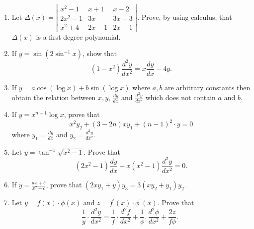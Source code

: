 \begin{enumerate}
\[\begin{array}{ccc}
    f^{\prime}(x) & \phi^{\prime}(x) & \psi^{\prime \prime}(x) \\
    f^{\prime \prime}(x) & \phi^{\prime \prime}(x) & \psi^{\prime \prime}(x)
    \end{array}\right|=\left\langle\left. f(x)\right|^3 \cdot\left|\begin{array}{cc}
    \lambda^{\prime}(x) & \mu^{\prime}(x) \\
    \lambda^{\prime \prime}(x) & \mu^{\prime \prime}(x)
    \end{array}\right| .\right.
    \]
    \item Let $\Delta(x)=\left|\begin{array}{ccc}x^2-1 & x+1 & x-2 \\ 2 x^2-1 & 3 x & 3 x-3 \\ x^2+4 & 2 x-1 & 2 x-1\end{array}\right|$. Prove, by using calculus, that $\Delta(x)$ is a first degree polynomial.
    \item If $y=\sin \left(2 \sin ^{-1} x\right)$, show that
    \[
    \left(1-x^2\right) \frac{d^2 y}{d x^2}=x \frac{d y}{d x}-4 y .
    \]
    \item If $y=a \cos (\log x)+b \sin (\log x)$ where $a, b$ are arbitrary constants then obtain the relation between $x, y$, $\frac{d y}{d x}$ and $\frac{d^2 y}{d x^2}$ which does not contain $a$ and $b$.

    \item If $y=x^{n-1} \log x$, prove that
$$
x^2 y_2+(3-2 n) x y_1+(n-1)^2 \cdot y=0
$$
where $y_1=\frac{d y}{d x}$ and $y_2=\frac{d^2 y}{d x^2}$.
\item Let $y=\tan ^{-1} \sqrt{x^2-1}$. Prove that
$$
\left(2 x^2-1\right) \frac{d y}{d x}+x\left(x^2-1\right) \frac{d^2 y}{d x^2}=0 .
$$
\item If $y=\frac{a x+b}{x^2+c}$, prove that $\left(2 x y_1+y\right) y_3=3\left(x y_2+y_1\right) y_2$.
\item Let $y=f(x) \cdot \phi(x)$ and $z=f^{\prime}(x) \cdot \phi^{\prime}(x)$.
Prove that
$$
\frac{1}{y} \cdot \frac{d^2 y}{d x^2}=\frac{1}{f} \cdot \frac{d^2 f}{d x^2}+\frac{1}{\phi}, \frac{d^2 \phi}{d x^2}+\frac{2 z}{f \phi} \text {. }
$$
\end{enumerate}
